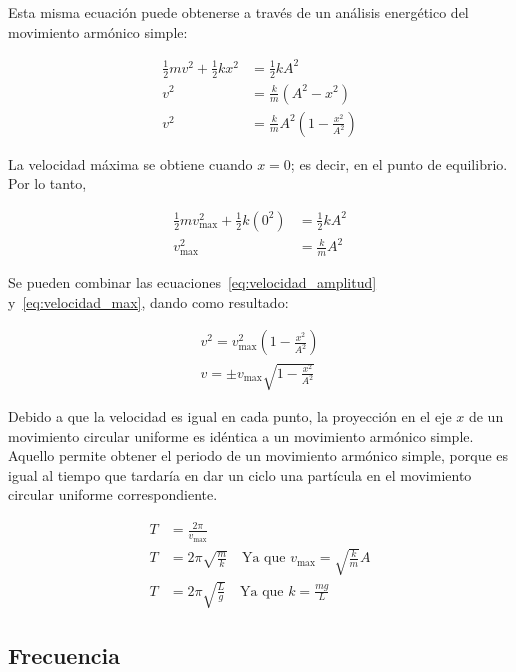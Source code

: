 \documentclass[letterpaper]{report}
\numberwithin{table}{section}
\begin{document}
Esta misma ecuación puede obtenerse a través de un análisis
energético del movimiento armónico simple:

\begin{align}
  \frac{1}{2}mv^{2} + \frac{1}{2}kx^{2} &= \frac{1}{2}kA^{2} \nonumber \\
  v^{2} &= \frac{k}{m}(A^{2} - x^{2}) \nonumber \\
  v^{2} &= \frac{k}{m}A^{2}\left(1 - \frac{x^{2}}{A^{2}}\right)
  \label{eq:velocidad_amplitud}
\end{align}

La velocidad máxima se obtiene cuando $x = 0$; es decir, en el punto de
equilibrio. Por lo tanto,

\begin{align}
  \frac{1}{2}mv_{\max}^{2} + \frac{1}{2}k(0^{2}) &= \frac{1}{2}kA^{2}
  \nonumber \\
  v_{\max}^{2} &= \frac{k}{m}A^{2} \label{eq:velocidad_max}
\end{align}

Se pueden combinar las ecuaciones~\eqref{eq:velocidad_amplitud}
y~\eqref{eq:velocidad_max}, dando como resultado:

\begin{align}
  v^{2} = v^{2}_{\max}\left(1 - \frac{x^{2}}{A^{2}}\right) \nonumber \\
  v = \pm v_{\max}\sqrt{1 - \frac{x^{2}}{A^{2}}}
\end{align}

Debido a que la velocidad es igual en cada punto, la proyección en el
eje $x$ de un movimiento circular uniforme es idéntica a un movimiento armónico
simple. Aquello permite obtener el periodo de un movimiento armónico
simple, porque es igual al tiempo que tardaría en dar un ciclo una
partícula en el movimiento circular uniforme correspondiente.

\begin{align}
  T &= \frac{2\pi}{v_{\max}} \nonumber \\
  T &= 2\pi\sqrt{\frac{m}{k}} \quad \text{Ya que $v_{\max} =
  \sqrt{\frac{k}{m}}A$} \nonumber \\
  T &= 2\pi\sqrt{\frac{L}{g}} \quad \text{Ya que $k =
  \frac{mg}{L}$}\label{eq:mas_periodo}
\end{align}

\subsection{Frecuencia}
\end{document}
